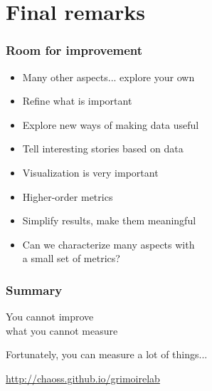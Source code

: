 \documentclass[17pt,aspectratio=169,hyperref=pdfusetitle]{beamer}
\begin{document}
\section{Final remarks}


\begin{frame}
\frametitle{Room for improvement}

{\Large
  \begin{itemize}
    \item Many other aspects... explore your own
    \item Refine what is important
    \item Explore new ways of making data useful
    \item Tell interesting stories based on data
    \item Visualization is very important
    \item Higher-order metrics
    \item Simplify results, make them meaningful
    \item Can we characterize many aspects with \\
      a small set of metrics?
\end{itemize}
}

\end{frame}


\begin{frame}
\frametitle{Summary}

\begin{center}
  {\Huge You cannot improve \\
    what you cannot measure \\
  }
\end{center}

\vspace{1cm}
\begin{flushright}
  {\Large Fortunately, you can measure a lot of things...}
  \vspace{.5cm}
  
  \url{http://chaoss.github.io/grimoirelab} \\
\end{flushright}

\end{frame}
\end{document}
